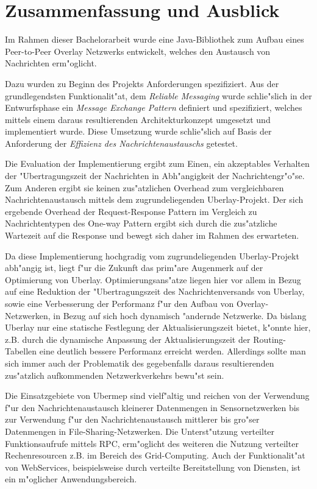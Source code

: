 \chapter{Zusammenfassung und Ausblick}
\label{cha:zusammenfassung}

Im Rahmen dieser Bachelorarbeit wurde eine Java-Bibliothek zum Aufbau eines Peer-to-Peer Overlay Netzwerks entwickelt, welches den Austausch von Nachrichten erm"oglicht.

Dazu wurden zu Beginn des Projekts Anforderungen spezifiziert. Aus der grundlegendsten Funktionalit"at, dem \emph{Reliable Messaging} wurde schlie"slich in der Entwurfsphase ein \emph{Message Exchange Pattern} definiert und spezifiziert, welches mittels einem daraus resultierenden Architekturkonzept umgesetzt und implementiert wurde. Diese Umsetzung wurde schlie"slich auf Basis der Anforderung der \emph{Effizienz des Nachrichtenaustauschs} getestet.

Die Evaluation der Implementierung ergibt zum Einen, ein akzeptables Verhalten der "Ubertragungszeit der Nachrichten in Abh"angigkeit der Nachrichtengr"o"se. Zum Anderen ergibt sie keinen zus"atzlichen Overhead zum vergleichbaren Nachrichtenaustausch mittels dem zugrundeliegenden Uberlay-Projekt. Der sich ergebende Overhead der Request-Response Pattern im Vergleich zu Nachrichtentypen des One-way Pattern ergibt sich durch die zus"atzliche Wartezeit auf die Response und bewegt sich daher im Rahmen des erwarteten. 

Da diese Implementierung hochgradig vom zugrundeliegenden Uberlay-Projekt abh"angig ist, liegt f"ur die Zukunft das prim"are Augenmerk auf der Optimierung von Uberlay. Optimierungsans"atze liegen hier vor allem in Bezug auf eine Reduktion der "Ubertragungszeit des Nachrichtenversands von Uberlay, sowie eine Verbesserung der Performanz  f"ur den Aufbau von Overlay-Netzwerken, in Bezug auf sich hoch dynamisch "andernde Netzwerke. Da bislang Uberlay nur eine statische Festlegung der Aktualisierungszeit bietet, k"onnte hier, z.B. durch die dynamische Anpassung der Aktualisierungszeit der Routing-Tabellen eine deutlich bessere Performanz erreicht werden. Allerdings sollte man sich immer auch der Problematik des gegebenfalls daraus resultierenden zus"atzlich aufkommenden Netzwerkverkehrs bewu"st sein.

Die Einsatzgebiete von Ubermep sind vielf"altig und reichen von der Verwendung f"ur den Nachrichtenaustausch kleinerer Datenmengen in Sensornetzwerken bis zur Verwendung f"ur den Nachrichtenaustausch mittlerer bis gro"ser Datenmengen in File-Sharing-Netzwerken. Die Unterst"utzung verteilter Funktionsaufrufe mittels RPC, erm"oglicht des weiteren die Nutzung verteilter Rechenresourcen z.B. im Bereich des Grid-Computing. Auch der Funktionalit"at von WebServices, beispielsweise durch verteilte Bereitstellung von Diensten, ist ein m"oglicher Anwendungsbereich.